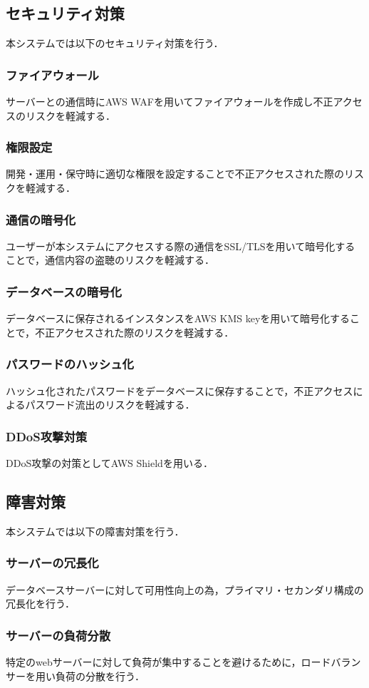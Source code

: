 \documentclass[a4paper, titlepage]{jsarticle}
\begin{document}
\subsection{セキュリティ対策}
本システムでは以下のセキュリティ対策を行う．
\subsubsection{ファイアウォール}
サーバーとの通信時にAWS WAFを用いてファイアウォールを作成し不正アクセスのリスクを軽減する．
\subsubsection{権限設定}
開発・運用・保守時に適切な権限を設定することで不正アクセスされた際のリスクを軽減する．
\subsubsection{通信の暗号化}
ユーザーが本システムにアクセスする際の通信をSSL/TLSを用いて暗号化することで，通信内容の盗聴のリスクを軽減する．
\subsubsection{データベースの暗号化}
データベースに保存されるインスタンスをAWS KMS keyを用いて暗号化することで，不正アクセスされた際のリスクを軽減する．
\subsubsection{パスワードのハッシュ化}
ハッシュ化されたパスワードをデータベースに保存することで，不正アクセスによるパスワード流出のリスクを軽減する．
\subsubsection{DDoS攻撃対策}
DDoS攻撃の対策としてAWS Shieldを用いる．
\subsection{障害対策}
本システムでは以下の障害対策を行う．
\subsubsection{サーバーの冗長化}
データベースサーバーに対して可用性向上の為，プライマリ・セカンダリ構成の冗長化を行う．
\subsubsection{サーバーの負荷分散}
特定のwebサーバーに対して負荷が集中することを避けるために，ロードバランサーを用い負荷の分散を行う．


\end{document}
